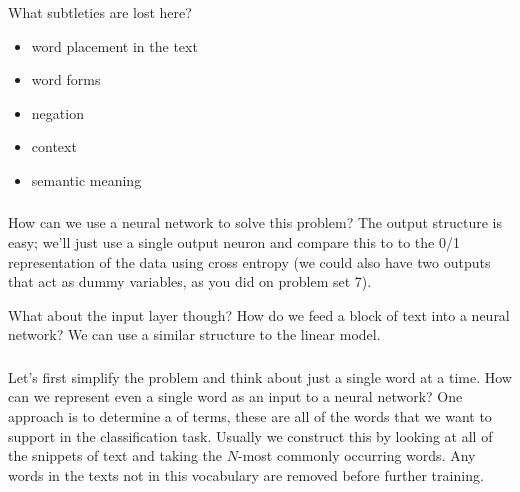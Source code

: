 \documentclass[xetex,mathserif,serif,aspectratio=169]{beamer}
\begin{document}
\begin{frame}[fragile] \frametitle{} \oldB \small


What subtleties are lost here?
\begin{itemize}
\item word placement in the text
\item word forms
\item negation
\item context
\item semantic meaning
\end{itemize}

\end{frame}


\begin{frame}[fragile] \frametitle{} \oldB \small


How can we use a neural network to solve this problem? The output structure
is easy; we'll just use a single output neuron and compare this to to the
0/1 representation of the data using cross entropy (we could also have two
outputs that act as dummy variables, as you did on problem set 7).

\pause What about the input layer though? How do we feed a block of text into a
neural network? We can use a similar structure to the linear model.

\end{frame}

\begin{frame}[fragile] \frametitle{} \oldB \small


Let's first simplify the problem and think about just a single word at a
time. How can we represent even a single word as an input to a neural
network? One approach is to determine a  of terms, these
are all of the words that we want to support in the classification task.
Usually we construct this by looking at all of the snippets of text and
taking the $N$-most commonly occurring words. Any words in the texts not
in this vocabulary are removed before further training.

\end{frame}
\end{document}

